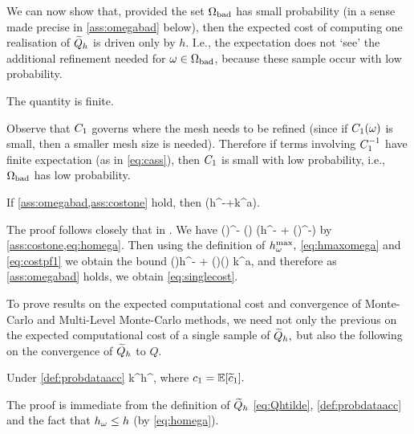 We can now show that, provided the set $\Omega_{\mathrm{bad}}$ has small probability (in a sense made precise in \cref{ass:omegabad} below), then the expected cost of computing one realisation of $\widetilde{Q}_{h}$ is driven only by $h.$ I.e., the expectation does not `see' the additional refinement needed for $\omega \in \Omega_{\mathrm{bad}}$, because these sample occur with low probability.

\label{ass:omegabad}
The quantity
\beq\label{eq:cass}
\cth \de {}
\eeq
is finite.
\eas

Observe that $C_{1}$ governs where the mesh needs to be refined (since if $C_{1}(\omega)$ is small, then a smaller mesh size is needed). Therefore if terms involving $C_{1}^{-1}$ have finite expectation (as in \cref{eq:cass}), then $C_{1}$ is small with low probability, i.e., $\Omega_{\mathrm{bad}}$ has low probability.

\label{lem:c}
If \cref{ass:omegabad,ass:costone} hold, then 
\beq\label{eq:singlecost}
\EXP{\Cost{\Qhtilde}} \leq \cth \mleft(h^{-\gamma}+k^{a\gamma}\mright).
\eeq
\ele

The proof follows closely that in \cite[Lemma 5.8]{GrPaSc:19}.
We have
\beq\label{eq:costpf1}
\Cost{\Qhtilde(\omega)} \leq \cthtilde(\omega)\homega^{-\gamma} \leq \cthtilde(\omega) \mleft(h^{-\gamma} + \mleft(\hmaxomega\mright)^{-\gamma}\mright)
\eeq
by \cref{ass:costone,eq:homega}. Then using  the definition of $h^{\max}_{\omega},$ \cref{eq:hmaxomega} and \cref{eq:costpf1} we obtain the bound
\beq\label{eq:costpf2}
\Cost{\Qhtilde(\omega)} \leq \cthtilde(\omega)h^{-\gamma} + \mleft(\cthtilde\Co\mright)(\omega) k^{a\gamma},
\eeq
and therefore as \cref{ass:omegabad} holds, we obtain \cref{eq:singlecost}.
\epf

To prove results on the expected computational cost and convergence of Monte-Carlo and Multi-Level Monte-Carlo methods, we need not only the previous  on the expected computational cost of a single sample of $\widetilde{Q}_{h},$ but also the following  on the convergence of $\widetilde{Q}_{h}$ to $Q$.

\label{ass:a}
Under \cref{def:probdataacc}
\beqs
{} \leq \co k^\sigma h^{\alpha},
\eeqs
where $\co = \EXP{\cotilde}.$
\ele

The proof is immediate from the definition of $\widetilde{Q}_{h}$ \cref{eq:Qhtilde}, \cref{def:probdataacc} and the fact that $h_{\omega} \leq h$ (by \cref{eq:homega}).
\epf

